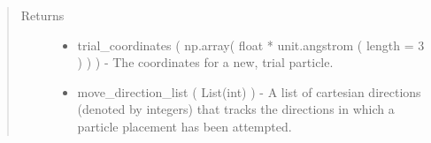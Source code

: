 \documentclass[letterpaper,12pt,english,openany,oneside]{sphinxmanual}
\begin{document}
\begin{fulllineitems}
\begin{quote}
\begin{description}
\begin{itemize}
\end{itemize}

\item[{Returns}] \leavevmode
\begin{itemize}
\item {} 
trial\_coordinates ( np.array( float * unit.angstrom ( length = 3 ) ) ) - The coordinates for a new, trial particle.

\item {} 
move\_direction\_list ( List(int) ) - A list of cartesian directions (denoted by integers) that tracks the directions in which a particle placement has been attempted.

\end{itemize}


\end{description}\end{quote}

\end{fulllineitems}

\end{document}
